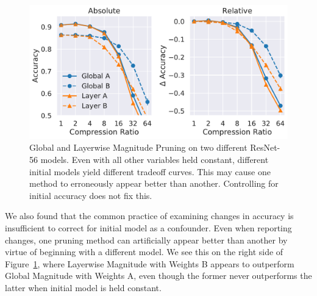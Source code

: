 \begin{figure}[t]
\begin{center}
\includegraphics[width=\linewidth]{shrinkbench/confounding_resnet56}
\caption{Global and Layerwise Magnitude Pruning on two different ResNet-56 models.
%
%
Even with all other variables held constant, different initial models yield different tradeoff curves. This may cause one method to erroneously appear better than another. Controlling for initial accuracy does not fix this. %
}
\label{fig:sb_resnet56_confounding}
\end{center}
\end{figure}
We also found that the common practice of examining changes in accuracy is insufficient to correct for initial model as a confounder. Even when reporting changes, one pruning method can artificially appear better than another by virtue of beginning with a different model. We see this on the right side of Figure~\ref{fig:sb_resnet56_confounding}, where Layerwise Magnitude with Weights B appears to outperform Global Magnitude with Weights A, even though the former never outperforms the latter when initial model is held constant.






